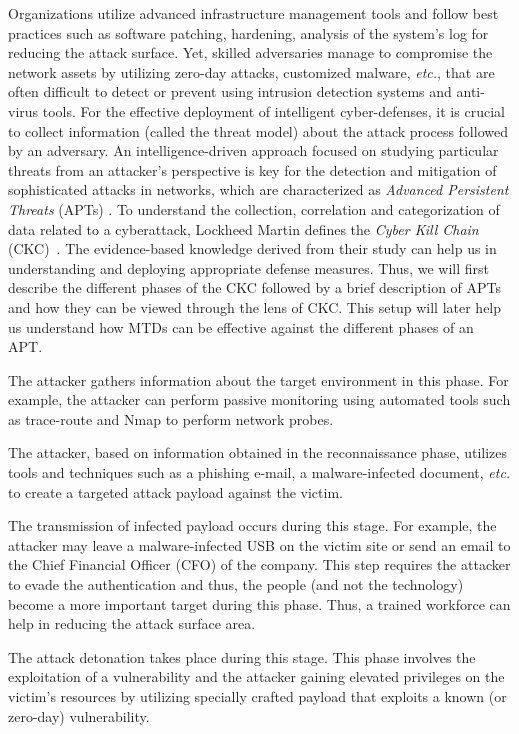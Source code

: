 \label{acs}
Organizations utilize advanced infrastructure management tools and follow best practices such as software patching, hardening, analysis of the system's log for reducing the attack surface. Yet, skilled adversaries manage to compromise the network assets by utilizing zero-day attacks, customized malware, {\em etc.}, that are often difficult to detect or prevent using intrusion detection systems and anti-virus tools. For the effective deployment of intelligent cyber-defenses, it is crucial to collect information (called the threat model) about the attack process followed by an adversary.
An intelligence-driven approach focused on studying particular threats from an attacker's perspective is key for the detection and mitigation of sophisticated attacks in networks, which are characterized as \emph{Advanced Persistent Threats} (APTs) . To understand the collection, correlation and categorization of data related to a cyberattack, Lockheed Martin defines the \emph{Cyber Kill Chain} (CKC)~. The evidence-based knowledge derived from their study can help us in understanding and  deploying appropriate defense measures. Thus, we will first describe the different phases of the CKC followed by a brief description of APTs and how they can be viewed through the lens of CKC. This setup will later help us understand how MTDs can be effective against the different phases of an APT.

The attacker gathers information about the target environment in this phase. For example, the attacker can perform passive monitoring using automated tools such as trace-route and Nmap to perform network probes.

The attacker, based on information obtained in the reconnaissance phase, utilizes tools and techniques such as a phishing e-mail, a malware-infected document, {\em etc.} to create a targeted attack payload against the victim.

The transmission of infected payload occurs during this stage. For example, the attacker may leave a malware-infected USB on the victim site or send an email to the Chief Financial Officer (CFO) of the company. This step requires the attacker to evade the authentication and thus, the people (and not the technology) become a more important target during this phase. Thus, a trained workforce can help in reducing the attack surface area.

The attack detonation takes place during this stage. This phase involves the exploitation of a vulnerability and the attacker gaining elevated privileges on the victim's resources by utilizing specially crafted payload that exploits a known (or zero-day) vulnerability.

